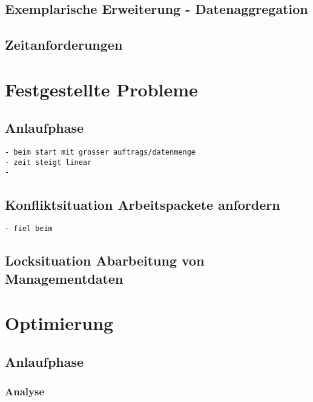 \subsection{Exemplarische Erweiterung - Datenaggregation}

\subsection{Zeitanforderungen}

\section{Festgestellte Probleme}
\subsection{Anlaufphase}

\begin{verbatim}
- beim start mit grosser auftrags/datenmenge
- zeit steigt linear
- 

\end{verbatim}

\subsection{Konfliktsituation Arbeitspackete anfordern}

\begin{verbatim}
- fiel beim
\end{verbatim}



\subsection{Locksituation Abarbeitung von Managementdaten}

\section{Optimierung}

\subsection{Anlaufphase}
\subsubsection{Analyse}


